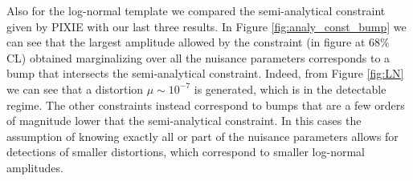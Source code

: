 Also for the log-normal template we compared the semi-analytical constraint given by PIXIE with our last three results. In Figure \ref{fig:analy_const_bump}
 we can see that the largest amplitude allowed by the constraint (in figure at 68\% CL) obtained marginalizing over all the nuisance parameters corresponds to a bump that intersects the semi-analytical constraint. Indeed, from Figure \ref{fig:LN} we can see that a distortion $\mu\sim10^{-7}$ is generated, which is in the detectable regime. The other constraints instead correspond to bumps that are a few orders of magnitude lower that the semi-analytical constraint. In this cases the assumption of knowing exactly all or part of the nuisance parameters allows for detections of smaller distortions, which correspond to smaller log-normal amplitudes.  






